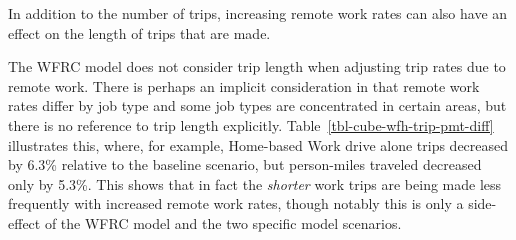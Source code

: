 \documentclass[fancy, oneside, mastersfancy, ms]{byuthesis}
\begin{document}
In addition to the number of trips, increasing remote work rates can
also have an effect on the length of trips that are made.

The WFRC model does not consider trip length when adjusting trip rates
due to remote work. There is perhaps an implicit consideration in that
remote work rates differ by job type and some job types are concentrated
in certain areas, but there is no reference to trip length explicitly.
Table~\ref{tbl-cube-wfh-trip-pmt-diff} illustrates this, where, for
example, Home-based Work drive alone trips decreased by 6.3\% relative
to the baseline scenario, but person-miles traveled decreased only by
5.3\%. This shows that in fact the \emph{shorter} work trips are being
made less frequently with increased remote work rates, though notably
this is only a side-effect of the WFRC model and the two specific model
scenarios.
\end{document}
